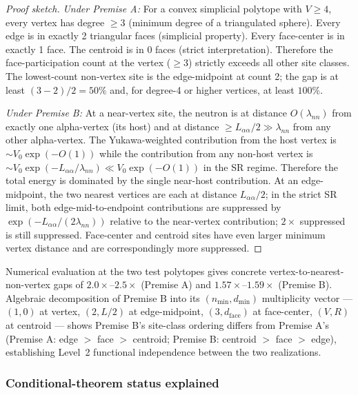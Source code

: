 \documentclass[11pt,letterpaper]{article}
\theoremstyle{definition}
\begin{document}
\begin{proof}[Proof sketch]
\emph{Under Premise A:} For a convex simplicial polytope with $V \geq 4$, every vertex has degree $\geq 3$ (minimum degree of a triangulated sphere). Every edge is in exactly 2 triangular faces (simplicial property). Every face-center is in exactly 1 face. The centroid is in 0 faces (strict interpretation). Therefore the face-participation count at the vertex ($\geq 3$) strictly exceeds all other site classes. The lowest-count non-vertex site is the edge-midpoint at count 2; the gap is at least $(3 - 2)/2 = 50\%$ and, for degree-4 or higher vertices, at least $100\%$.

\emph{Under Premise B:} At a near-vertex site, the neutron is at distance $O(\lambda_{nn})$ from exactly one alpha-vertex (its host) and at distance $\geq L_{\alpha\alpha}/2 \gg \lambda_{nn}$ from any other alpha-vertex. The Yukawa-weighted contribution from the host vertex is $\sim V_0 \exp(-O(1))$ while the contribution from any non-host vertex is $\sim V_0 \exp(-L_{\alpha\alpha}/\lambda_{nn}) \ll V_0 \exp(-O(1))$ in the SR regime. Therefore the total energy is dominated by the single near-host contribution. At an edge-midpoint, the two nearest vertices are each at distance $L_{\alpha\alpha}/2$; in the strict SR limit, both edge-mid-to-endpoint contributions are suppressed by $\exp(-L_{\alpha\alpha}/(2\lambda_{nn}))$ relative to the near-vertex contribution; $2\times$ suppressed is still suppressed. Face-center and centroid sites have even larger minimum vertex distance and are correspondingly more suppressed.
\end{proof}

Numerical evaluation at the two test polytopes gives concrete vertex-to-nearest-non-vertex gaps of $2.0\times$--$2.5\times$ (Premise A) and $1.57\times$--$1.59\times$ (Premise B). Algebraic decomposition of Premise B into its $(n_{\min}, d_{\min})$ multiplicity vector --- $(1, 0)$ at vertex, $(2, L/2)$ at edge-midpoint, $(3, d_{\text{face}})$ at face-center, $(V, R)$ at centroid --- shows Premise B's site-class ordering differs from Premise A's (Premise A: edge $>$ face $>$ centroid; Premise B: centroid $>$ face $>$ edge), establishing Level~2 functional independence between the two realizations.

\subsubsection{Conditional-theorem status explained}
\end{document}
